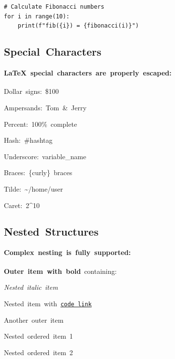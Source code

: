 \documentclass{article}
\begin{document}
{\begin{verbatim}
# Calculate Fibonacci numbers
for i in range(10):
    print(f"fib({i}) = {fibonacci(i)}")
\end{verbatim}\relax\relax \subsection{Special~Characters}\relax \relax\relax \paragraph{LaTeX~special~characters~are~properly~escaped:}\relax \relax\relax \begin{itemize}
{\relax\relax \item Dollar~signs:~\$100\relax\relax \item Ampersands:~Tom~\&~Jerry\relax\relax \item Percent:~100\%~complete\relax\relax \item Hash:~\#hashtag\relax\relax \item Underscore:~variable\_name\relax\relax \item Braces:~\{curly\}~braces\relax\relax \item Tilde:~\textasciitilde{}/home/user\relax\relax \item Caret:~2\textasciicircum{}10}
\end{itemize}\relax\relax \subsection{Nested~Structures}\relax \relax\relax \paragraph{Complex~nesting~is~fully~supported:}\relax \relax\relax \begin{itemize}
{\relax\relax \item {\relax\relax \textbf{Outer~item~with~bold}\relax \relax\relax ~containing:\relax\relax \begin{itemize}
{\relax\relax \item \textit{Nested~italic~item}\relax \relax\relax \item {\relax\relax Nested~item~with~\relax\relax \href{https://nested.example.com}{\texttt{code~link}\relax }\relax }}
\end{itemize}}\relax\relax \item {\relax\relax Another~outer~item\relax\relax \begin{enumerate}
{\relax\relax \item Nested~ordered~item~1\relax\relax \item Nested~ordered~item~2}

\end{enumerate}}}
\end{itemize}}
\end{document}
